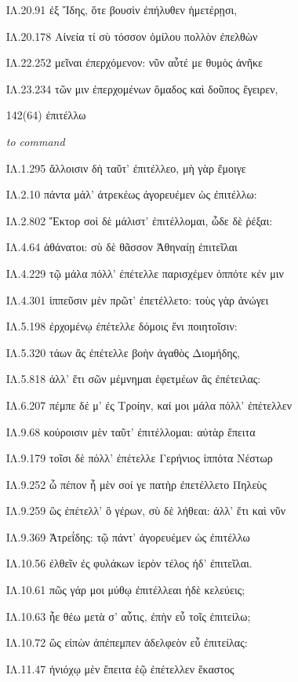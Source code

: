\begin{enumerate}
{ΙΛ.20.91 ἐξ Ἴδης, ὅτε βουσὶν ἐπήλυθεν ἡμετέρῃσι,

ΙΛ.20.178 Αἰνεία τί σὺ τόσσον ὁμίλου πολλὸν ἐπελθὼν

ΙΛ.22.252 μεῖναι ἐπερχόμενον: νῦν αὖτέ με θυμὸς ἀνῆκε

ΙΛ.23.234 τῶν μιν ἐπερχομένων ὅμαδος καὶ δοῦπος ἔγειρεν,

}

\clearpage
\item[\large 142(64)]{\large \g ἐπιτέλλω	}

\hspace{0.2cm} \textit{ to command }

{\g
ΙΛ.1.295 ἄλλοισιν δὴ ταῦτ' ἐπιτέλλεο, μὴ γὰρ ἔμοιγε

ΙΛ.2.10 πάντα μάλ' ἀτρεκέως ἀγορευέμεν ὡς ἐπιτέλλω:

ΙΛ.2.802 Ἕκτορ σοὶ δὲ μάλιστ' ἐπιτέλλομαι, ὧδε δὲ ῥέξαι:

ΙΛ.4.64 ἀθάνατοι: σὺ δὲ θᾶσσον Ἀθηναίῃ ἐπιτεῖλαι

ΙΛ.4.229 τῷ μάλα πόλλ' ἐπέτελλε παρισχέμεν ὁππότε κέν μιν

ΙΛ.4.301 ἱππεῦσιν μὲν πρῶτ' ἐπετέλλετο: τοὺς γὰρ ἀνώγει

ΙΛ.5.198 ἐρχομένῳ ἐπέτελλε δόμοις ἔνι ποιητοῖσιν:

ΙΛ.5.320 τάων ἃς ἐπέτελλε βοὴν ἀγαθὸς Διομήδης,

ΙΛ.5.818 ἀλλ' ἔτι σῶν μέμνημαι ἐφετμέων ἃς ἐπέτειλας:

ΙΛ.6.207 πέμπε δέ μ' ἐς Τροίην, καί μοι μάλα πόλλ' ἐπέτελλεν

ΙΛ.9.68 κούροισιν μὲν ταῦτ' ἐπιτέλλομαι: αὐτὰρ ἔπειτα

ΙΛ.9.179 τοῖσι δὲ πόλλ' ἐπέτελλε Γερήνιος ἱππότα Νέστωρ

ΙΛ.9.252 ὦ πέπον ἦ μὲν σοί γε πατὴρ ἐπετέλλετο Πηλεὺς

ΙΛ.9.259 ὣς ἐπέτελλ' ὃ γέρων, σὺ δὲ λήθεαι: ἀλλ' ἔτι καὶ νῦν

ΙΛ.9.369 Ἀτρεΐδης: τῷ πάντ' ἀγορευέμεν ὡς ἐπιτέλλω

ΙΛ.10.56 ἐλθεῖν ἐς φυλάκων ἱερὸν τέλος ἠδ' ἐπιτεῖλαι.

ΙΛ.10.61 πῶς γάρ μοι μύθῳ ἐπιτέλλεαι ἠδὲ κελεύεις;

ΙΛ.10.63 ἦε θέω μετὰ σ' αὖτις, ἐπὴν εὖ τοῖς ἐπιτείλω;

ΙΛ.10.72 ὣς εἰπὼν ἀπέπεμπεν ἀδελφεὸν εὖ ἐπιτείλας:

ΙΛ.11.47 ἡνιόχῳ μὲν ἔπειτα ἑῷ ἐπέτελλεν ἕκαστος

}
\end{enumerate}
